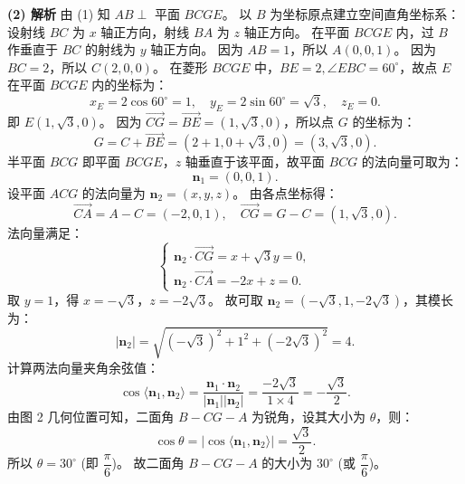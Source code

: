\begin{answer}
\textbf{(2) 解析}
由 (1) 知 $AB \perp$ 平面 $BCGE$。
以 $B$ 为坐标原点建立空间直角坐标系：
设射线 $BC$ 为 $x$ 轴正方向，射线 $BA$ 为 $z$ 轴正方向。
在平面 $BCGE$ 内，过 $B$ 作垂直于 $BC$ 的射线为 $y$ 轴正方向。
因为 $AB = 1$，所以 $A(0, 0, 1)$。
因为 $BC = 2$，所以 $C(2, 0, 0)$。
在菱形 $BCGE$ 中，$BE = 2, \angle EBC = 60^\circ$，故点 $E$ 在平面 $BCGE$ 内的坐标为：
\nopagebreak[4]
\[x_E = 2\cos 60^\circ = 1, \quad y_E = 2\sin 60^\circ = \sqrt{3}, \quad z_E = 0.\]
即 $E(1, \sqrt{3}, 0)$。
因为 $\vec{CG} = \vec{BE} = (1, \sqrt{3}, 0)$，所以点 $G$ 的坐标为：
\nopagebreak[4]
\[G = C + \vec{BE} = (2 + 1, 0 + \sqrt{3}, 0) = (3, \sqrt{3}, 0).\]
半平面 $BCG$ 即平面 $BCGE$，$z$ 轴垂直于该平面，故平面 $BCG$ 的法向量可取为：
\nopagebreak[4]
\[\boldsymbol{n}_1 = (0, 0, 1).\]
设平面 $ACG$ 的法向量为 $\boldsymbol{n}_2 = (x, y, z)$。
由各点坐标得：
\nopagebreak[4]
\[\vec{CA} = A - C = (-2, 0, 1), \quad \vec{CG} = G - C = (1, \sqrt{3}, 0).\]
法向量满足：
\nopagebreak[4]
\[\begin{cases} \boldsymbol{n}_2 \cdot \vec{CG} = x + \sqrt{3}y = 0, \\ \boldsymbol{n}_2 \cdot \vec{CA} = -2x + z = 0. \end{cases}\]
取 $y = 1$，得 $x = -\sqrt{3}$，$z = -2\sqrt{3}$。
故可取 $\boldsymbol{n}_2 = (-\sqrt{3}, 1, -2\sqrt{3})$，其模长为：
\nopagebreak[4]
\[|\boldsymbol{n}_2| = \sqrt{(-\sqrt{3})^2 + 1^2 + (-2\sqrt{3})^2} = 4.\]
计算两法向量夹角余弦值：
\nopagebreak[4]
\[\cos\langle\boldsymbol{n}_1, \boldsymbol{n}_2\rangle = \frac{\boldsymbol{n}_1 \cdot \boldsymbol{n}_2}{|\boldsymbol{n}_1||\boldsymbol{n}_2|} = \frac{-2\sqrt{3}}{1 \times 4} = -\frac{\sqrt{3}}{2}.\]
由图 2 几何位置可知，二面角 $B - CG - A$ 为锐角，设其大小为 $\theta$，则：
\nopagebreak[4]
\[\cos\theta = |\cos\langle\boldsymbol{n}_1, \boldsymbol{n}_2\rangle| = \frac{\sqrt{3}}{2}.\]
所以 $\theta = 30^\circ$ (即 $\dfrac{\pi}{6}$)。
故二面角 $B - CG - A$ 的大小为 $30^\circ$ (或 $\dfrac{\pi}{6}$)。



\end{answer}
